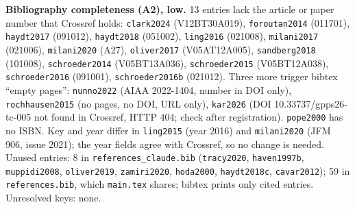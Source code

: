 \documentclass[10pt,a4paper]{article}
\begin{document}
\textbf{Bibliography completeness (A2), low.} 13 entries lack the article or paper number that Crossref holds:
\texttt{clark2024} (V12BT30A019), \texttt{foroutan2014} (011701), \texttt{haydt2017} (091012), \texttt{haydt2018}
(051002), \texttt{ling2016} (021008), \texttt{milani2017} (021006), \texttt{milani2020} (A27), \texttt{oliver2017}
(V05AT12A005), \texttt{sandberg2018} (101008), \texttt{schroeder2014} (V05BT13A036), \texttt{schroeder2015}
(V05BT12A038), \texttt{schroeder2016} (091001), \texttt{schroeder2016b} (021012). Three more trigger bibtex ``empty
pages'': \texttt{nunno2022} (AIAA 2022-1404, number in DOI only), \texttt{rochhausen2015} (no pages, no DOI, URL only),
\texttt{kar2026} (DOI 10.33737/gpps26-tc-005 not found in Crossref, HTTP 404; check after registration).
\texttt{pope2000} has no ISBN. Key and year differ in \texttt{ling2015} (year 2016) and \texttt{milani2020} (JFM 906,
issue 2021); the year fields agree with Crossref, so no change is needed. Unused entries: 8 in
\texttt{references\_claude.bib} (\texttt{tracy2020}, \texttt{haven1997b}, \texttt{muppidi2008}, \texttt{oliver2019},
\texttt{zamiri2020}, \texttt{hoda2000}, \texttt{haydt2018c}, \texttt{cavar2012}); 59 in \texttt{references.bib}, which
\texttt{main.tex} shares; bibtex prints only cited entries. Unresolved keys: none.
\end{document}
